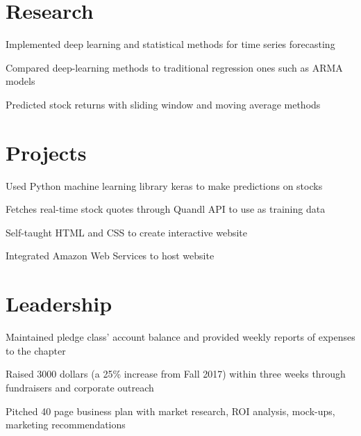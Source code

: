 \documentclass[]{deedy-resume-openfont}
\begin{document}
\begin{minipage}[t]{0.66\textwidth}
\section{Research}
\begin{tightemize} 
\item Implemented deep learning and statistical methods for time series forecasting
\item Compared deep-learning methods to traditional regression ones such as ARMA models
\item Predicted stock returns with sliding window and moving average methods
\end{tightemize}
\sectionsep


\section{Projects}
\location{}
\begin{tightemize} 
\item Used Python machine learning library keras to make predictions on stocks
\item Fetches real-time stock quotes through Quandl API to use as training data
\end{tightemize}
\location{}
\begin{tightemize} 
\item Self-taught HTML and CSS to create interactive website
\item Integrated Amazon Web Services to host website
\end{tightemize}
\sectionsep


\section{Leadership}
\begin{tightemize} 
\item Maintained pledge class’ account balance and provided weekly reports of expenses to the chapter
\item Raised 3000 dollars (a 25\% increase from Fall 2017) within three weeks through fundraisers and corporate outreach
\item Pitched 40 page business plan with market research, ROI analysis, mock-ups, marketing recommendations
\end{tightemize}
\sectionsep



\end{minipage} 
\end{document}
